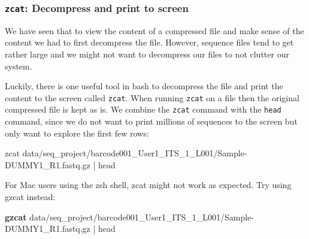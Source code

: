\documentclass[
  letterpaper,
  DIV=11,
  numbers=noendperiod]{scrreprt}
\newenvironment{Shaded}{}{}
\newcommand{\ExtensionTok}[1]{\textcolor[rgb]{0.84,0.23,0.29}{\textbf{#1}}}
\newcommand{\FunctionTok}[1]{\textcolor[rgb]{0.44,0.26,0.76}{#1}}
\newcommand{\KeywordTok}[1]{\textcolor[rgb]{0.84,0.23,0.29}{#1}}
\newcommand{\NormalTok}[1]{\textcolor[rgb]{0.14,0.16,0.18}{#1}}
\begin{document}
\subsubsection{\texorpdfstring{\texttt{zcat}: Decompress and print to
screen}{zcat: Decompress and print to screen}}\label{zcat-decompress-and-print-to-screen}

We have seen that to view the content of a compressed file and make
sense of the content we had to first decompress the file. However,
sequence files tend to get rather large and we might not want to
decompress our files to not clutter our system.

Luckily, there is one useful tool in bash to decompress the file and
print the content to the screen called \texttt{zcat}. When running
\texttt{zcat} on a file then the original compressed file is kept as is.
We combine the \texttt{zcat} command with the \texttt{head} command,
since we do not want to print millions of sequences to the screen but
only want to explore the first few rows:

\begin{Shaded}
\begin{Highlighting}[]
\FunctionTok{zcat}\NormalTok{ data/seq\_project/barcode001\_User1\_ITS\_1\_L001/Sample{-}DUMMY1\_R1.fastq.gz }\KeywordTok{|} \FunctionTok{head}
\end{Highlighting}
\end{Shaded}

\begin{tcolorbox}[enhanced jigsaw, title=\textcolor{quarto-callout-important-color}{\faExclamation}\hspace{0.5em}{Zcat for Mac users}, colframe=quarto-callout-important-color-frame, opacitybacktitle=0.6, rightrule=.15mm, arc=.35mm, left=2mm, colbacktitle=quarto-callout-important-color!10!white, bottomrule=.15mm, leftrule=.75mm, toprule=.15mm, opacityback=0, bottomtitle=1mm, colback=white, toptitle=1mm, breakable, titlerule=0mm, coltitle=black]

For Mac users using the zsh shell, zcat might not work as expected. Try
using gzcat instead:

\begin{Shaded}
\begin{Highlighting}[]
\ExtensionTok{gzcat}\NormalTok{ data/seq\_project/barcode001\_User1\_ITS\_1\_L001/Sample{-}DUMMY1\_R1.fastq.gz }\KeywordTok{|} \FunctionTok{head}
\end{Highlighting}
\end{Shaded}

\end{tcolorbox}
\end{document}
